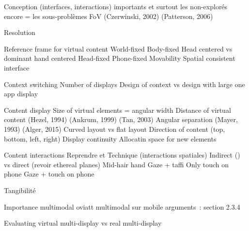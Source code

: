 Conception (interfaces, interactions) importants et surtout les non-explorés encore = les sous-problèmes
        FoV (Czerwinski, 2002) (Patterson, 2006) \cite{KishishitaKiyokawaOrloskyEtAl2014} 

        Resolution

        Reference frame for virtual content 
            World-fixed \cite{EnsFinneganIrani2014} 
            Body-fixed \cite{EnsFinneganIrani2014} 
                Head centered vs dominant hand centered 
            Head-fixed \cite{EnsFinneganIrani2014} 
            Phone-fixed
            Movability \cite{EnsHincapie-RamosIrani2014}
            Spatial consistent interface \cite{LiDearmanTruong2009}

        Context switching 
            Number of displays \cite{RashidNacentaQuigley2012} \cite{CauchardLoechtefeldFraserEtAl2012}
            Design of context vs design with large one app display \cite{BallNorth2008}

        Content display
            Size of virtual elements = angular width \cite{ShuppBallYostEtAl2006} \cite{BallNorth2008}
            Distance of virtual content (Hezel, 1994) (Ankrum, 1999) (Tan, 2003) \cite{ChanKaoChenEtAl2010} \cite{EnsFinneganIrani2014} 
            Angular separation (Mayer, 1993) \cite{EnsFinneganIrani2014} \cite{KishishitaKiyokawaOrloskyEtAl2014} (Alger, 2015) 
            Curved layout vs flat layout \cite{ShuppBallYostEtAl2006} 
            Direction of content (top, bottom, left, right) \cite{EnsFinneganIrani2014} 
            Display continuity \cite{TanCzerwinski2003} \cite{RashidNacentaQuigley2012}
            Allocatin space for new elements \cite{BellFeiner2000}

        Content interactions
        	Reprendre \cite{Bernatchez2008} et \cite{JankowskiHachet2013}
        	Technique (interactions spatiales)
	        	Indirect (\cite{TeatherStuerzlinger2011}) vs direct (revoir ethereal planes)
	            Mid-hair hand \cite{EnsFinneganIrani2014} \cite{ChanKaoChenEtAl2010} \cite{JonesSodhiForsythEtAl2012}
	            Gaze + taffi 
	            Only touch on phone 
	            Gaze + touch on phone

	        Tangibilité

            Importance multimodal oviatt \cite{Oviatt2003}
            multimodal sur mobile \cite{HuerstVanWezel2011}
            arguments~: \cite{CarmignianiFurhtAnisettiEtAl2011} section 2.3.4

        Evaluating virtual multi-display vs real multi-display 

